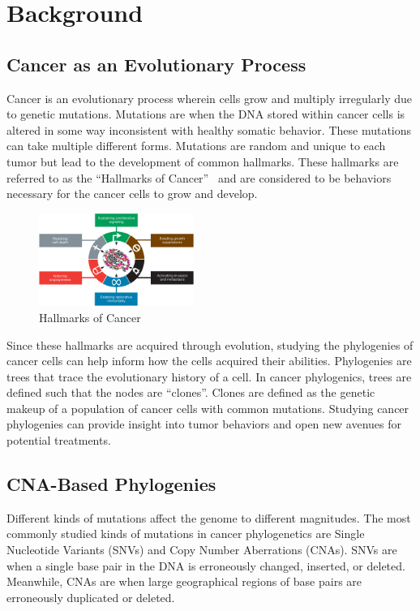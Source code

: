 \section{Background}

\subsection{Cancer as an Evolutionary Process}

Cancer is an evolutionary process wherein cells grow and multiply irregularly due to genetic mutations. Mutations are when the DNA stored within cancer cells is altered in some way inconsistent with healthy somatic behavior. These mutations can take multiple different forms. Mutations are random and unique to each tumor but lead to the development of common hallmarks. These hallmarks are referred to as the ``Hallmarks of Cancer''~\cite{hallmarks_of_cancer} and are considered to be behaviors necessary for the cancer cells to grow and develop. 

\begin{figure}[ht]\label{fig:hallmarks}
    \centering
    \includegraphics[width=0.45\textwidth]{figures/hallmarks.jpg}
    \caption{Hallmarks of Cancer~\cite{hallmarks_of_cancer}}
\end{figure}

Since these hallmarks are acquired through evolution, studying the phylogenies of cancer cells can help inform how the cells acquired their abilities. Phylogenies are trees that trace the evolutionary history of a cell. In cancer phylogenics, trees are defined such that the nodes are ``clones''. Clones are defined as the genetic makeup of a population of cancer cells with common mutations. Studying cancer phylogenies can provide insight into tumor behaviors and open new avenues for potential treatments. 

\subsection{CNA-Based Phylogenies}

Different kinds of mutations affect the genome to different magnitudes. The most commonly studied kinds of mutations in cancer phylogenetics are Single Nucleotide Variants (SNVs) and Copy Number Aberrations (CNAs). SNVs are when a single base pair in the DNA is erroneously changed, inserted, or deleted. Meanwhile, CNAs are when large geographical regions of base pairs are erroneously duplicated or deleted. 

